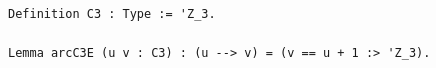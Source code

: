 \begin{lstlisting}[language=Rocq]
Definition C3 : Type := 'Z_3.

Lemma arcC3E (u v : C3) : (u --> v) = (v == u + 1 :> 'Z_3).
\end{lstlisting}
